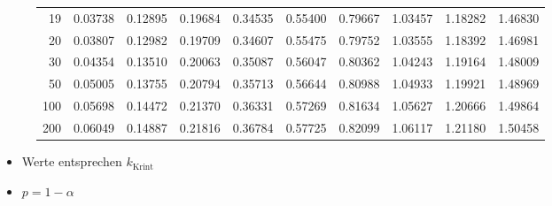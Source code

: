 \begin{figure}[h!]
\begin{center}
\begin{tabular}{|r|rrr|rrr|rrr|}
19&0.03738&0.12895&0.19684&0.34535&0.55400&0.79667&1.03457&1.18282&1.46830\\
20&0.03807&0.12982&0.19709&0.34607&0.55475&0.79752&1.03555&1.18392&1.46981\\
30&0.04354&0.13510&0.20063&0.35087&0.56047&0.80362&1.04243&1.19164&1.48009\\
50&0.05005&0.13755&0.20794&0.35713&0.56644&0.80988&1.04933&1.19921&1.48969\\
100&0.05698&0.14472&0.21370&0.36331&0.57269&0.81634&1.05627&1.20666&1.49864\\
200&0.06049&0.14887&0.21816&0.36784&0.57725&0.82099&1.06117&1.21180&1.50458\\
\hline
\end{tabular}
\end{center}
\end{figure}

\begin{itemize}
  \item Werte entsprechen $k_{\text{Krint}}$
  \item $p = 1 - \alpha$
\end{itemize}

\pagebreak
